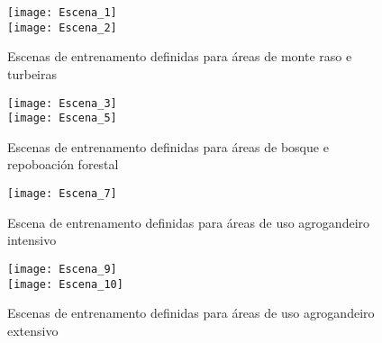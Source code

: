\documentclass[11pt,a4paper]{article}
\begin{document}

\begin{figure}
\caption{Escenas de entrenamento definidas para áreas de monte raso e turbeiras}\label{fig:escenas1}
\texttt{[image: Escena\_1]}\\
\texttt{[image: Escena\_2]}
\end{figure}

\begin{figure}
\caption{Escenas de entrenamento definidas para áreas de bosque e repoboación forestal}\label{fig:escenas2}
\texttt{[image: Escena\_3]}\\
\texttt{[image: Escena\_5]}
\end{figure}

\begin{figure}
\caption{Escena de entrenamento definidas para áreas de uso agrogandeiro intensivo}\label{fig:escenas3}
\texttt{[image: Escena\_7]}
\end{figure}

\begin{figure}
\caption{Escenas de entrenamento definidas para áreas de uso agrogandeiro extensivo}\label{fig:escenas4}
\texttt{[image: Escena\_9]}\\
\texttt{[image: Escena\_10]}
\end{figure}
\end{document}
